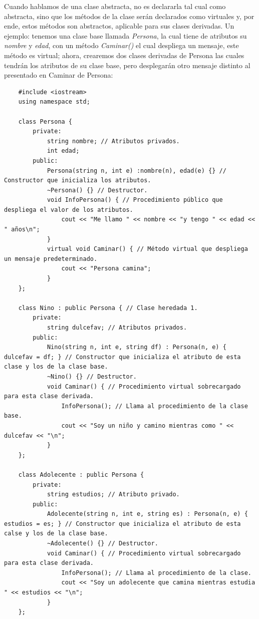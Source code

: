 Cuando hablamos de una clase abstracta, no es declararla tal cual como abstracta, sino que los métodos de la clase serán declarados como virtuales y, por ende, estos métodos son abstractos, aplicable para sus clases derivadas. Un ejemplo: tenemos una clase base llamada \textit{Persona}, la cual tiene de atributos su \textit{nombre} y \textit{edad}, con un método \textit{Caminar()} el cual despliega un mensaje, este método es virtual; ahora, crearemos dos clases derivadas de Persona las cuales tendrán los atributos de su clase base, pero desplegarán otro mensaje distinto al presentado en Caminar de Persona:
\begin{lstlisting}
    #include <iostream>
    using namespace std;
    
    class Persona {
        private:
            string nombre; // Atributos privados.
            int edad;
        public:
            Persona(string n, int e) :nombre(n), edad(e) {} // Constructor que inicializa los atributos.
            ~Persona() {} // Destructor.
            void InfoPersona() { // Procedimiento público que despliega el valor de los atributos.
                cout << "Me llamo " << nombre << "y tengo " << edad << " años\n";
            }
            virtual void Caminar() { // Método virtual que despliega un mensaje predeterminado.
                cout << "Persona camina";
            }
    };

    class Nino : public Persona { // Clase heredada 1.
        private:
            string dulcefav; // Atributos privados.
        public:
            Nino(string n, int e, string df) : Persona(n, e) { dulcefav = df; } // Constructor que inicializa el atributo de esta clase y los de la clase base.
            ~Nino() {} // Destructor.
            void Caminar() { // Procedimiento virtual sobrecargado para esta clase derivada.
                InfoPersona(); // Llama al procedimiento de la clase base.
                cout << "Soy un niño y camino mientras como " << dulcefav << "\n";
            }
    };

    class Adolecente : public Persona {
        private:
            string estudios; // Atributo privado.
        public:
            Adolecente(string n, int e, string es) : Persona(n, e) { estudios = es; } // Constructor que inicializa el atributo de esta calse y los de la clase base.
            ~Adolecente() {} // Destructor.
            void Caminar() { // Procedimiento virtual sobrecargado para esta clase derivada.
                InfoPersona(); // Llama al procedimiento de la clase.
                cout << "Soy un adolecente que camina mientras estudia " << estudios << "\n";
            }
    };


\end{lstlisting}
